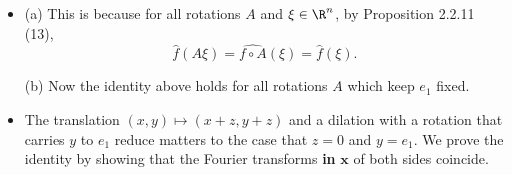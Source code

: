 \begin{itemize}
Then
\begin{align*}
    &\int_{\R^n}\frac{dt}{|x-t|^{\alpha_1}|y-t|^{\alpha_2}}\\
    =\ &(|t|^{-\alpha_1}*|t|^{-\alpha_2})(x-y)\\
    =\ &((|t|^{-\alpha_1})^\wedge(|t|^{-\alpha_2})^\wedge)^\vee(x-y)\\
    =\ &c_{-\alpha_1}c_{-\alpha_2}(|t|^{-n+\alpha_1-n+\alpha_2})^\vee(x-y)\\
    =\ &c_{-\alpha_1}c_{-\alpha_2}c_{-2n+\alpha_1+\alpha_2}|x-y|^{n-\alpha_1-\alpha_2},
\end{align*}
where
\begin{align*}
    &c_{-\alpha_1}c_{-\alpha_2}c_{-2n+\alpha_1+\alpha_2}\\
    =\ &\pi^{\alpha_1-\frac{n}{2}}\frac{\varGamma(\frac{n-\alpha_1}{2})}{\varGamma(\frac{\alpha_1}{2})}
    \pi^{\alpha_2-\frac{n}{2}}\frac{\varGamma(\frac{n-\alpha_2}{2})}{\varGamma(\frac{\alpha_2}{2})}
    \pi^{2n-\alpha_1-\alpha_2-\frac{n}{2}}\frac{\varGamma(\frac{n-2n+\alpha_1+\alpha_2}{2})}{\varGamma(-\frac{-2n+\alpha_1+\alpha_2}{2})}\\
    =\ &\pi^\frac{n}{2}\frac{\varGamma(\frac{n-\alpha_1}{2})\varGamma(\frac{n-\alpha_2}{2})\varGamma(\frac{\alpha_1+\alpha_2-n}{2})}
    {\varGamma(\frac{\alpha_1}{2})\varGamma(\frac{\alpha_2}{2})\varGamma(n-\frac{\alpha_1+\alpha_2}{2})}.
\end{align*}

\item[2.4.10]

(a) This is because for all rotations $A$ and $\xi\in\R^n$, 
by Proposition 2.2.11 (13),
$$\hat{f}(A\xi)=\widehat{f\circ A}(\xi)=\hat{f}(\xi).$$

(b) Now the identity above holds for all rotations $A$ which keep $e_1$ fixed.

\item[2.4.11]

The translation $(x,y)\mapsto(x+z,y+z)$ and a dilation with a rotation 
that carries $y$ to $e_1$ reduce matters to the case that $z=0$ and $y=e_1$. 
We prove the identity by showing that the Fourier transforms 
\textbf{in} $\boldsymbol{x}$ of both sides coincide.


\end{itemize}
